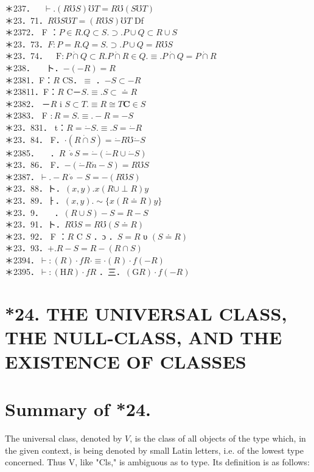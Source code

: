 \documentclass[10pt]{article}
\begin{document}
＊237．$\quad \vdash .(R \mho S) \mho T=R \mho(S \mho T)$\\
＊23．71．$R \mho S \mho T=(R \mho S) \mho T$ Df\\
＊2372． F ：$P \in R . Q \subset S . \supset . P \cup Q \subset R \cup S$\\
＊23．73．$F: P=R . Q=S . \supset . P \cup Q=R \mho S$\\
＊23．74．$\quad \mathrm{F}: P \dot{\cap} Q \subset R . P \dot{\cap} R \in Q . \equiv . P \dot{\cap} Q=P \dot{\cap} R$\\
＊238．$\quad$ ト．$-(-R)=R$\\
＊2381．F：$R$ CS．$\equiv$ ．$-S \subset-R$\\
＊23811．F：$R$ C－$S . \equiv . S \subset \doteq R$\\
＊2382． －$R$ i $S \subset T . \equiv R \cong T \mathbf{C} \in S$\\
＊2383． F $: R=S . \equiv .-R=-S$\\
＊23．831． t：$R=\dot{-} S . \equiv . S=\dot{-} R$\\
＊23．84． F．$\cdot(R \dot{\cap} S)=\dot{-} R \mho \dot{-} S$\\
＊2385．$\quad$ ．$R$ $\dot{\circ} S=\dot{-}(\dot{-} R \cup \dot{-} S)$\\
＊23．86． F．$-(\dot{-} R \dot{n}-S)=R \mho S$\\
＊2387．$\vdash .-R \dot{\circ}-S=-(R \mho S)$\\
＊23．88．ト．$(x, y) . x(R \cup \perp R) y$\\
＊23．89．ㅏ．$(x, y) . \sim\{x(R \doteq R) y\}$\\
＊23．9．$\quad$ ．$(R \cup S)-S=R-S$\\
＊23．91．ト．$R \mho S=R \mho(S \doteq R)$\\
＊23．92． F ：$R$ C $S$ ．ɔ ．$S=R$ υ $(S \doteq R)$\\
＊23．93．$+. R-S=R-(R \cap S)$\\
＊2394．$\vdash:(R) \cdot f R \cdot \equiv \cdot(R) \cdot f(-R)$\\
＊2395．$\vdash:(\mathrm{H} R) \cdot f R$ ．三．$(\mathrm{G} R) \cdot f(-R)$

\section*{*24. THE UNIVERSAL CLASS, THE NULL-CLASS, AND THE EXISTENCE OF CLASSES}
\section*{Summary of *24.}
The universal class, denoted by $V$, is the class of all objects of the type which, in the given context, is being denoted by small Latin letters, i.e. of the lowest type concerned. Thus V, like "Cls," is ambiguous as to type. Its definition is as follows:
\end{document}
